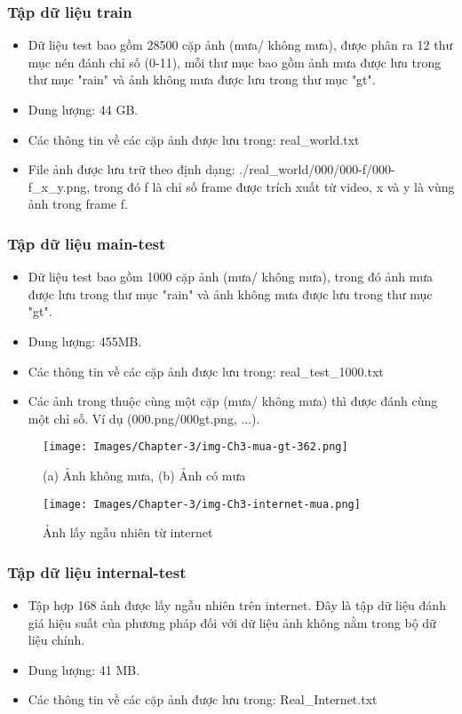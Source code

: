 \subsubsection{Tập dữ liệu train}
\begin{itemize}
    \item Dữ liệu test bao gồm 28500 cặp ảnh (mưa/ không mưa), được phân ra 12 thư mục nén đánh chỉ số (0-11), mỗi thư mục bao gồm ảnh mưa được lưu trong thư mục "rain" và ảnh không mưa được lưu trong thư mục "gt".
    \item Dung lượng: 44 GB.
    \item Các thông tin về các cặp ảnh được lưu trong: real\_world.txt
    \item File ảnh được lưu trữ theo định dạng:  ./real\_world/000/000-f/000-f\_x\_y.png, trong đó  f là chỉ số frame được trích xuất từ video,  x và y là vùng ảnh trong frame f.
\end{itemize}
\subsubsection{Tập dữ liệu main-test}
\begin{itemize}
    \item Dữ liệu test bao gồm 1000 cặp ảnh (mưa/ không mưa), trong đó ảnh mưa được lưu trong thư mục "rain" và ảnh không mưa được lưu trong thư mục "gt".
    \item Dung lượng: 455MB.
    \item Các thông tin về các cặp ảnh được lưu trong: real\_test\_1000.txt
    \item Các ảnh trong thuộc cùng một cặp (mưa/ không mưa) thì được đánh cùng một chỉ số. Ví dụ (000.png/000gt.png, ...).
\end{itemize}

\begin{figure}[ht!]
    \texttt{[image: Images/Chapter-3/img-Ch3-mua-gt-362.png]}
    \caption{(a) Ảnh không mưa, (b) Ảnh có mưa}
    \label{fig:rain-gt-test-2}
\end{figure}

\begin{figure}[ht!]
    \texttt{[image: Images/Chapter-3/img-Ch3-internet-mua.png]}
    \caption{Ảnh lấy ngẫu nhiên từ internet}
    \label{fig:rain-internet}
\end{figure}

\subsubsection{Tập dữ liệu internal-test}
\begin{itemize}
    \item Tập hợp 168 ảnh được lấy ngẫu nhiên trên internet. Đây là tập dữ liệu đánh giá hiệu suất của phương pháp đối với dữ liệu ảnh không nằm trong bộ dữ liệu chính.
    \item Dung lượng: 41 MB.
    \item Các thông tin về các cặp ảnh được lưu trong: Real\_Internet.txt
\end{itemize}


